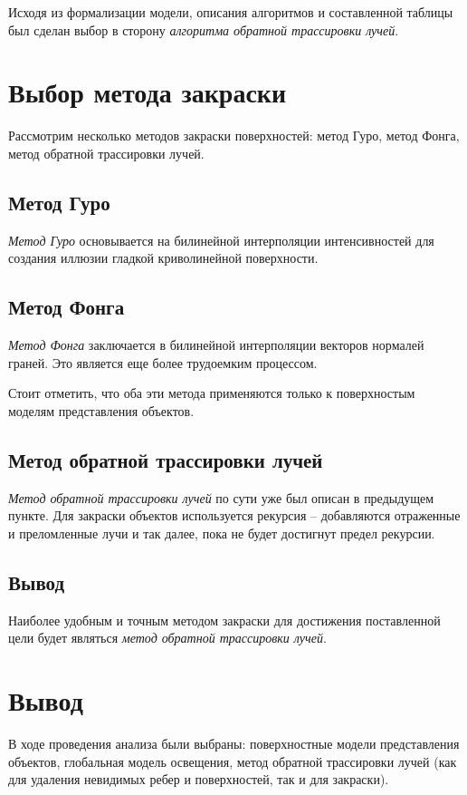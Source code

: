 \indent Исходя из формализации модели, описания алгоритмов и составленной таблицы был сделан выбор в сторону \emph{алгоритма обратной трассировки лучей}.

\section{Выбор метода закраски}

Рассмотрим несколько методов закраски поверхностей: метод Гуро, метод Фонга, метод обратной трассировки лучей. \cite{colormethods}

\subsection{Метод Гуро}

\emph{Метод Гуро} основывается на билинейной интерполяции интенсивностей для создания иллюзии гладкой криволинейной поверхности.

\subsection{Метод Фонга}

\emph{Метод Фонга} заключается в билинейной интерполяции векторов нормалей граней. Это является еще более трудоемким процессом.

Стоит отметить, что оба эти метода применяются только к поверхностым моделям представления объектов.

\subsection{Метод обратной трассировки лучей}

\emph{Метод обратной трассировки лучей} по сути уже был описан в предыдущем пункте.
Для закраски объектов используется рекурсия -- добавляются отраженные и преломленные лучи и так далее, пока не будет достигнут предел рекурсии.

\subsection{Вывод}

Наиболее удобным и точным методом закраски для достижения поставленной цели будет являться \emph{метод обратной трассировки лучей}.

\section{Вывод}

В ходе проведения анализа были выбраны: поверхностные модели представления объектов, глобальная модель освещения, метод обратной трассировки лучей (как для удаления невидимых ребер и поверхностей, так и для закраски).